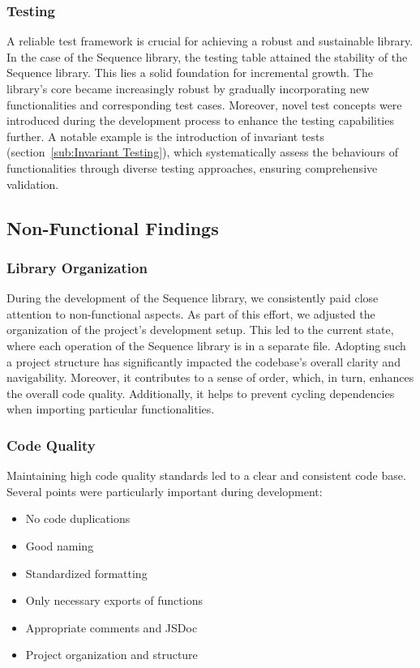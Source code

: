 \subsubsection{Testing}
\label{subsub:Testing}
A reliable test framework is crucial for achieving a robust and sustainable
library. In the case of the Sequence library, the testing table attained the
stability of the Sequence library. This lies a solid foundation for incremental
growth. The library's core became increasingly robust by gradually
incorporating new functionalities and corresponding test cases. Moreover, novel
test concepts were introduced during the development process to enhance the
testing capabilities further. A notable example is the introduction of
invariant tests (section~\ref{sub:Invariant Testing}), which systematically
assess the behaviours of functionalities through diverse testing approaches,
ensuring comprehensive validation.

\subsection{Non-Functional Findings}
\label{sub:Non-Functional Aspects}
\subsubsection{Library Organization}
\label{subsub:Library Organisation}
During the development of the Sequence library, we consistently paid close
attention to non-functional aspects. As part of this effort, we adjusted the
organization of the project's development setup. This led to the current state,
where each operation of the Sequence library is in a separate file. Adopting
such a project structure has significantly impacted the codebase's overall
clarity and navigability. Moreover, it contributes to a sense of order, which,
in turn, enhances the overall code quality. Additionally, it helps to prevent
cycling dependencies when importing particular functionalities.
\subsubsection{Code Quality}
\label{subsub:Code Quality}
Maintaining high code quality standards led to a clear and consistent
code base. Several points were particularly important during development:
\begin{itemize}
  \item{No code duplications}
  \item{Good naming}
  \item{Standardized formatting}
  \item{Only necessary exports of functions}
  \item{Appropriate comments and JSDoc}
  \item{Project organization and structure}
\end{itemize}


